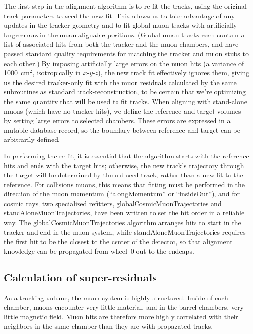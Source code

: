 \documentclass[12pt]{article}
\begin{document}
The first step in the alignment algorithm is to re-fit the tracks,
using the original track parameters to seed the new fit.  This allows
us to take advantage of any updates in the tracker geometry and to fit
global-muon tracks with artificially large errors in the muon alignable
positions.  (Global muon tracks each contain a list of associated hits
from both the tracker and the muon chambers, and have passed standard
quality requirements for matching the tracker and muon stubs to each
other.)  By imposing artificially large errors on the muon hits (a
variance of 1000~cm$^{2}$, isotropically in $x$-$y$-$z$), the new
track fit effectively ignores them, giving us the desired tracker-only
fit with the muon residuals calculated by the same subroutines as
standard track-reconstruction, to be certain that we're optimizing the
same quantity that will be used to fit tracks.  When aligning with
stand-alone muons (which have no tracker hits), we define the reference
and target volumes by setting large errors to selected chambers.
These errors are expressed in a mutable database record, so the
boundary between reference and target can be arbitrarily defined.

In performing the re-fit, it is essential that the algorithm starts
with the reference hits and ends with the target hits; otherwise, the
new track's trajectory through the target will be determined by the
old seed track, rather than a new fit to the reference.  For
collisions muons, this means that fitting must be performed in the
direction of the muon momentum (``alongMomentum'' or ``insideOut''),
and for cosmic rays, two specialized refitters,
globalCosmicMuonTrajectories and standAloneMuonTrajectories, have been
written to set the hit order in a reliable way.  The
globalCosmicMuonTrajectories algorithm arranges hits to start in the
tracker and end in the muon system, while standAloneMuonTrajectories
requires the first hit to be the closest to the center of the
detector, so that alignment knowledge can be propagated from wheel~0
out to the endcaps.

\subsection{Calculation of super-residuals}
\label{sec:super_residuals}

As a tracking volume, the muon system is highly structured.  Inside of
each chamber, muons encounter very little material, and in the barrel
chambers, very little magnetic field.  Muon hits are therefore more
highly correlated with their neighbors in the same chamber than they
are with propagated tracks.
\end{document}
